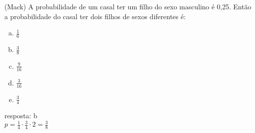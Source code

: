\begin{ex}
 (Mack) A probabilidade de um casal ter um filho do sexo masculino é 0,25. Então a probabilidade do casal ter dois filhos de sexos diferentes é:
    \begin{enumerate}[(a)]
    \item $\frac{1}{6}$
    \item $\frac{3}{8}$
    \item $\frac{9}{16}$
    \item $\frac{3}{16}$
    \item $\frac{3}{4}$
    \end{enumerate}
      \begin{sol}
       resposta: b \\
       $p=\frac{1}{4}\cdot \frac{3}{4}\cdot2 = \frac{3}{8}$
      \end{sol}
\end{ex}